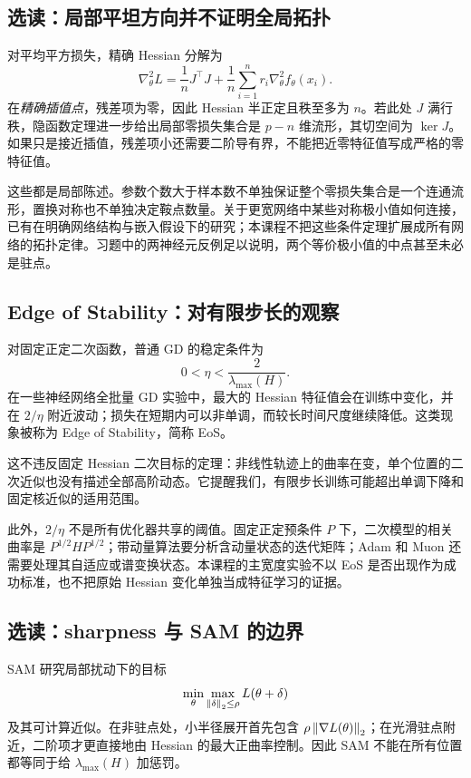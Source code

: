 \subsection{选读：局部平坦方向并不证明全局拓扑}

对平均平方损失，精确 Hessian 分解为
\begin{equation}
 \nabla_\theta^2L
 =\frac1nJ^\top J+
 \frac1n\sum_{i=1}^n r_i\nabla_\theta^2f_\theta(x_i).
 \label{l5:hessian-decomposition}
\end{equation}
在\emph{精确插值点}，残差项为零，因此 Hessian 半正定且秩至多为
$n$。若此处 $J$ 满行秩，隐函数定理进一步给出局部零损失集合是
$p-n$ 维流形，其切空间为 $\ker J$。如果只是接近插值，残差项小还需要二阶导有界，不能把近零特征值写成严格的零特征值。

这些都是局部陈述。参数个数大于样本数不单独保证整个零损失集合是一个连通流形，置换对称也不单独决定鞍点数量。关于更宽网络中某些对称极小值如何连接，已有在明确网络结构与嵌入假设下的研究\citep{Simsek2021}；本课程不把这些条件定理扩展成所有网络的拓扑定律。习题中的两神经元反例足以说明，两个等价极小值的中点甚至未必是驻点。

\subsection{Edge of Stability：对有限步长的观察}

对固定正定二次函数，普通 GD 的稳定条件为
\[
 0<\eta<\frac2{\lambda_{\max}(H)}.
\]
在一些神经网络全批量 GD 实验中，最大的 Hessian 特征值会在训练中变化，并在 $2/\eta$ 附近波动；损失在短期内可以非单调，而较长时间尺度继续降低。这类现象被称为 Edge of Stability，简称 EoS\citep{Cohen2021}。

这不违反固定 Hessian 二次目标的定理：非线性轨迹上的曲率在变，单个位置的二次近似也没有描述全部高阶动态。它提醒我们，有限步长训练可能超出单调下降和固定核近似的适用范围。

此外，$2/\eta$ 不是所有优化器共享的阈值。固定正定预条件 $P$ 下，二次模型的相关曲率是
$P^{1/2}HP^{1/2}$；带动量算法要分析含动量状态的迭代矩阵；Adam 和 Muon 还需要处理其自适应或谱变换状态。本课程的主宽度实验不以 EoS 是否出现作为成功标准，也不把原始 Hessian 变化单独当成特征学习的证据。

\subsection{选读：sharpness 与 SAM 的边界}

SAM 研究局部扰动下的目标
\begin{equation}
 \min_\theta\max_{\left\lVert\delta\right\rVert_2\leq\rho}L(\theta+\delta)
 \label{l5:sam}
\end{equation}
及其可计算近似\citep{Foret2021}。在非驻点处，小半径展开首先包含
$\rho\left\lVert\nabla L(\theta)\right\rVert_2$；在光滑驻点附近，二阶项才更直接地由 Hessian 的最大正曲率控制。因此 SAM 不能在所有位置都等同于给
$\lambda_{\max}(H)$ 加惩罚。

